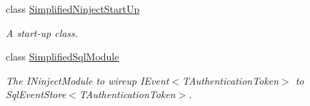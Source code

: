 \begin{DoxyCompactItemize}
class \hyperlink{classCqrs_1_1Ninject_1_1Configuration_1_1SimplifiedNinjectStartUp}{Simplified\+Ninject\+Start\+Up}
\begin{DoxyCompactList}\small\item\em A start-\/up class. \end{DoxyCompactList}\item 
class \hyperlink{classCqrs_1_1Ninject_1_1Configuration_1_1SimplifiedSqlModule}{Simplified\+Sql\+Module}
\begin{DoxyCompactList}\small\item\em The I\+Ninject\+Module to wireup I\+Event$<$\+T\+Authentication\+Token$>$ to Sql\+Event\+Store$<$\+T\+Authentication\+Token$>$. \end{DoxyCompactList}\end{DoxyCompactItemize}
